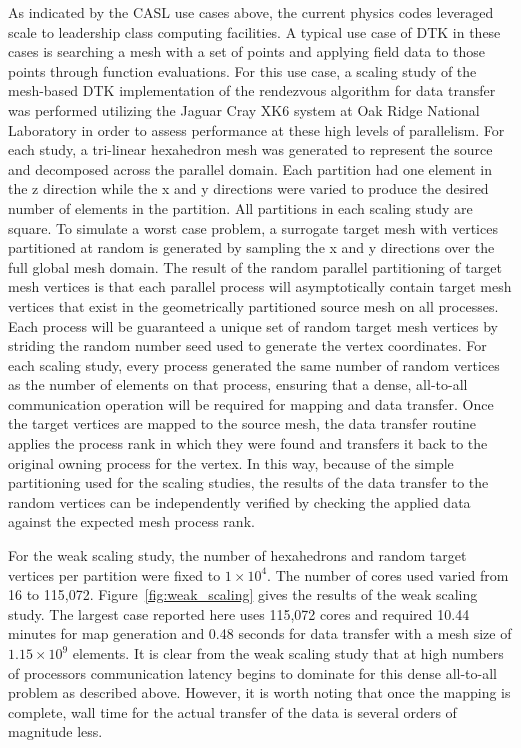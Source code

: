 \documentclass{mc2013}
\begin{document}
\label{sec:scaling_study}

As indicated by the CASL use cases above, the current physics codes
leveraged scale to leadership class computing facilities. A typical
use case of DTK in these cases is searching a mesh with a set of
points and applying field data to those points through function
evaluations. For this use case, a scaling study of the mesh-based DTK
implementation of the rendezvous algorithm for data transfer was
performed utilizing the Jaguar Cray XK6 system at Oak Ridge National
Laboratory in order to assess performance at these high levels of
parallelism. For each study, a tri-linear hexahedron mesh was
generated to represent the source and decomposed across the parallel
domain. Each partition had one element in the z direction while the x
and y directions were varied to produce the desired number of elements
in the partition. All partitions in each scaling study are square.  To
simulate a worst case problem, a surrogate target mesh with vertices
partitioned at random is generated by sampling the x and y directions
over the full global mesh domain. The result of the random parallel
partitioning of target mesh vertices is that each parallel process
will asymptotically contain target mesh vertices that exist in the
geometrically partitioned source mesh on all processes. Each process
will be guaranteed a unique set of random target mesh vertices by
striding the random number seed used to generate the vertex
coordinates. For each scaling study, every process generated the same
number of random vertices as the number of elements on that process,
ensuring that a dense, all-to-all communication operation will be
required for mapping and data transfer. Once the target vertices are
mapped to the source mesh, the data transfer routine applies the
process rank in which they were found and transfers it back to the
original owning process for the vertex. In this way, because of the
simple partitioning used for the scaling studies, the results of the
data transfer to the random vertices can be independently verified by
checking the applied data against the expected mesh process rank.

\label{subsec:weak_scaling}
For the weak scaling study, the number of hexahedrons and random
target vertices per partition were fixed to $1 \times 10^4$. The
number of cores used varied from 16 to
115,072. Figure~\ref{fig:weak_scaling} gives the results of the weak
scaling study. The largest case reported here uses 115,072 cores and
required 10.44 minutes for map generation and 0.48 seconds for data
transfer with a mesh size of $1.15 \times 10^9$ elements. It is clear
from the weak scaling study that at high numbers of processors
communication latency begins to dominate for this dense all-to-all
problem as described above. However, it is worth noting that once the
mapping is complete, wall time for the actual transfer of the data is
several orders of magnitude less.
\end{document}
